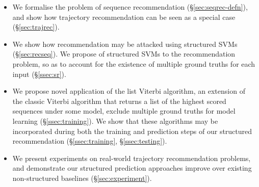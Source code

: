 \begin{itemize}[noitemsep,leftmargin=12pt]\itemmoveup
	\item We formalise the problem of sequence recommendation (\S\ref{sec:seqrec-defn}), and show how trajectory recommendation can be seen as a special case (\S\ref{sec:trajrec}).

	\item We show how  recommendation may be attacked using structured SVMs (\S\ref{sec:recseq}).
	We propose  of structured SVMs to the recommendation problem, so as to account for the existence of multiple ground truths for each input (\S\ref{ssec:sr}).

    \item We propose  novel application of the list Viterbi algorithm, an extension of the classic Viterbi algorithm that returns a list of the highest scored sequences under some model,  exclude multiple ground truths for model learning (\S\ref{ssec:training}).
	We show that these algorithms may be incorporated during both the training %
	and prediction steps of our structured recommendation (\S\ref{ssec:training}, \S\ref{ssec:testing}).
	
	\item We present experiments on real-world trajectory recommendation problems, and demonstrate our structured prediction approaches improve over existing non-structured baselines (\S\ref{sec:experiment}).\itemmoveup
\end{itemize}

